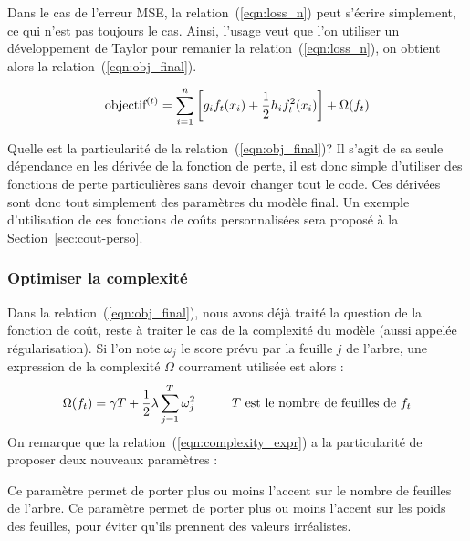 Dans le cas de l'erreur MSE, la relation~(\ref{eqn:loss_n}) peut s'écrire \og simplement\fg, ce qui n'est pas toujours le cas. Ainsi, l'usage veut que l'on utiliser un développement de Taylor pour remanier la relation~(\ref{eqn:loss_n}), on obtient alors la relation~(\ref{eqn:obj_final}).

\begin{equation}
\textnormal{objectif}^{(t)}=\sum_{i=1}^n\left[g_if_t(x_i)+\frac{1}{2}h_if_t^2(x_i)\right]+\Omega(f_t)
\label{eqn:obj_final}
\end{equation}

Quelle est la particularité de la relation~(\ref{eqn:obj_final})? Il s'agit de sa seule dépendance en les dérivée de la fonction de perte, il est donc simple d'utiliser des fonctions de perte particulières sans devoir changer tout le code. Ces dérivées sont donc tout simplement des paramètres du modèle final. Un exemple d'utilisation de ces fonctions de coûts personnalisées sera proposé à la Section~\ref{sec:cout-perso}.

\subsubsection{Optimiser la complexité}
\label{sec:opt_complexity}
Dans la relation~(\ref{eqn:obj_final}), nous avons déjà traité la question de la fonction de coût, reste à traiter le cas de la complexité du modèle (aussi appelée régularisation). Si l'on note $\omega_j$ le score prévu par la feuille $j$ de l'arbre, une expression de la complexité $\Omega$ courrament utilisée est alors :
\begin{equation}
\Omega(f_t)=\gamma T+\frac{1}{2}\lambda\sum_{j=1}^T\omega_j^2\hspace{1cm}\textnormal{$T$ est le nombre de feuilles de $f_t$}
\label{eqn:complexity_expr}
\end{equation}
On remarque que la relation~(\ref{eqn:complexity_expr}) a la particularité de proposer deux nouveaux paramètres :
\begin{itemize}
	\itemperso{$\gamma$}Ce paramètre permet de porter plus ou moins l'accent sur le nombre de feuilles de l'arbre.
	\itemperso{$\lambda$}Ce paramètre permet de porter plus ou moins l'accent sur les poids des feuilles, pour éviter qu'ils prennent des valeurs irréalistes.
\end{itemize}

